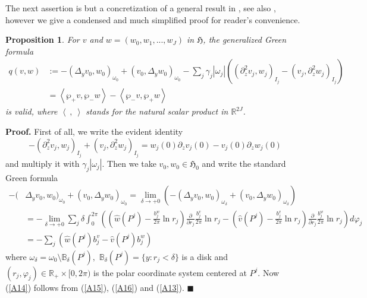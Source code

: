 \documentclass[11pt]{article}%
\newtheorem{proposition}[theorem]{Proposition}
\numberwithin{equation}{section}
\begin{document}
The next assertion is but a concretization of a general result in \cite{na161,
na159, na165}, see also \cite[\S 6.2]{NaPl}, however we give a condensed and
much simplified proof for reader's convenience.

\begin{proposition}
\label{prop2A}For $v$ and $w=(w_{0},w_{1},...,w_{J})$ in $\mathfrak{H}$, the
generalized Green formula%
\begin{align}
q(v,w)  &  :=-(\Delta_{y}v_{0},w_{0})_{\omega_{0}}+(v_{0},\Delta_{y}%
w_{0})_{\omega_{0}}-%
{\textstyle\sum\nolimits_{j}}
\gamma_{j}|\omega_{j}|((\partial_{z}^{2}v_{j},w_{j})_{I_{j}}-(v_{j}%
,\partial_{z}^{2}w_{j})_{I_{j}})\label{A14}\\
&  =\left\langle \wp_{+}v,\wp_{-}w\right\rangle -\left\langle \wp_{-}v,\wp
_{+}w\right\rangle \nonumber
\end{align}
is valid, where $\left\langle \ ,\ \right\rangle $ stands for the natural
scalar product in $\mathbb{R}^{2J}$.
\end{proposition}

\textbf{Proof.} First of all, we write the evident identity%
\begin{equation}
-(\partial_{z}^{2}v_{j},w_{j})_{I_{j}}+(v_{j},\partial_{z}^{2}w_{j})_{I_{j}%
}=w_{j}(0)\partial_{z}v_{j}(0)-v_{j}(0)\partial_{z}w_{j}(0) \label{A15}%
\end{equation}
and multiply it with $\gamma_{j}|\omega_{j}|$. Then we take $v_{0}%
,w_{0}\in\mathfrak{H}_{0}$ and write the standard Green formula
\begin{align}
-(  &  \Delta_{y}v_{0},w_{0})_{\omega_{0}}+(v_{0},\Delta_{y}w_{0})_{\omega
_{0}}=\lim_{\delta\rightarrow+0}(-(\Delta_{y}v_{0},w_{0})_{\omega_{\delta}%
}+(v_{0},\Delta_{y}w_{0})_{\omega_{\delta}})\label{A16}\\
&  =-\lim_{\delta\rightarrow+0}\sum\nolimits_{j}\delta\int_{0}^{2\pi}\left(
\left(  \widehat{w}(P^{j})-\frac{b_{j}^{w}}{2\pi}\ln r_{j}\right)
\frac{\partial}{\partial r_{j}}\frac{b_{j}^{v}}{2\pi}\ln r_{j}-\left(
\widehat{v}(P^{j})-\frac{b_{j}^{v}}{2\pi}\ln r_{j}\right)  \frac{\partial
}{\partial r_{j}}\frac{b_{j}^{w}}{2\pi}\ln r_{j}\right)  d\varphi
_{j}\nonumber\\
&  =-\sum\nolimits_{j}(\widehat{w}(P^{j})b_{j}^{v}-\widehat{v}(P^{j})b_{j}%
^{w})\nonumber
\end{align}
where $\omega_{\delta}=\omega_{0}\setminus\mathbb{B}_{\delta}(P^{j}),$
$\mathbb{B}_{\delta}(P^{j})=\{y:r_{j}<\delta\}$ is a disk and $(r_{j}%
,\varphi_{j})\in\mathbb{R}_{+}\times\lbrack0,2\pi)$ is the polar coordinate
system centered at $P^{j}$. Now (\ref{A14}) follows from (\ref{A15}),
(\ref{A16}) and (\ref{A13}). $\blacksquare$
\end{document}
